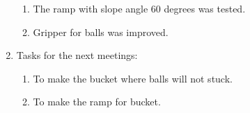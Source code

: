 \begin{enumerate}
\begin{enumerate}
		\item The ramp with slope angle 60 degrees was tested.
		
		\item Gripper for balls was improved.
		
	\end{enumerate}
	
	\item Tasks for the next meetings:
	\begin{enumerate}
		
		\item To make the bucket where balls will not stuck.
		
		\item To make the ramp for bucket.
			
	\end{enumerate}
\end{enumerate}
\fillpage